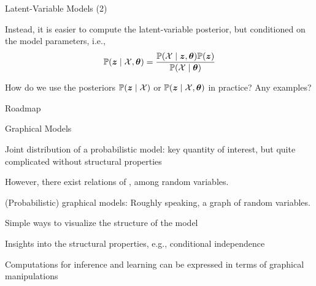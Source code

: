 \documentclass[handout,fleqn,aspectratio=169]{beamer}
\begin{document}
\begin{frame}{Latent-Variable Models (2)}

\plitemsep 0.05in

\bci 

\item Instead, it is easier to compute the latent-variable posterior, but conditioned on the model parameters, i.e., 
$$
\mathbb{P}( \bm{z} \mid \mathcal X,\bm{\theta} ) = \frac{\mathbb{P}( \mathcal X\mid \bm{z},\bm{\theta} ) \mathbb{P}( \bm{z} )}{\mathbb{P}( \mathcal X \mid \bm{\theta} )}
$$

\item \question How do we use the posteriors $\mathbb{P}( \bm{z} \mid \mathcal X )$ or $\mathbb{P}( \bm{z} \mid \mathcal X,\bm{\theta} )$ in practice? Any examples?
\eci
\end{frame}

\begin{frame}{Roadmap}

\plitemsep 0.1in

\bci 

\item {}
\item {} 
\item {}
\item {} 
\item {}
\item {}
\eci
\end{frame}

\begin{frame}{Graphical Models}

\plitemsep 0.1in

\bci 

\item Joint distribution of a probabilistic model: key quantity of interest, but quite complicated without structural properties

\item However, there exist relations of ,  among random variables.  

\item (Probabilistic) graphical models: Roughly speaking, a graph of random variables.

\bci
\item Simple ways to visualize the structure of the model
\item Insights into the structural properties, e.g., conditional independence
\item Computations for inference and learning can be expressed in terms of graphical manipulations
\eci
\eci
\end{frame}
\end{document}
